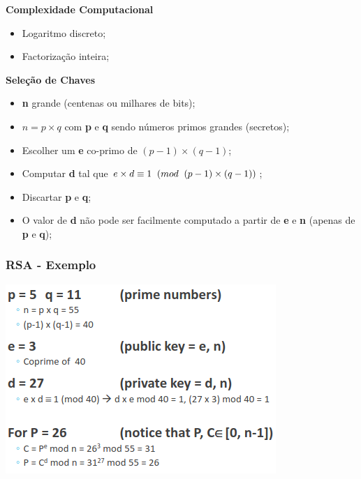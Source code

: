 \documentclass{article}
\begin{document}
\begin{flushleft}
  \textbf{Complexidade Computacional}
  \begin{itemize}
    \item Logaritmo discreto;
    \item Factorização inteira;
  \end{itemize}

  \vspace{2mm}

  \textbf{Seleção de Chaves}
  \begin{itemize}
    \item \textbf{n} grande (centenas ou milhares de bits);
    \item \textbf{$n = p \times q$} com \textbf{p} e \textbf{q} sendo números primos grandes (secretos);
    \item Escolher um \textbf{e} co-primo de \textbf{$(p-1) \times (q-1)$};
    \item Computar \textbf{d} tal que \textbf{$e \times d \equiv 1 \hspace{2mm} (mod \hspace{2mm} (p-1) \times (q-1))$};
    \item Discartar \textbf{p} e \textbf{q};
    \item O valor de \textbf{d} não pode ser facilmente computado a partir de \textbf{e} e \textbf{n} (apenas de \textbf{p} e \textbf{q});
  \end{itemize}
\end{flushleft}

\pagebreak

\subsubsection{RSA - Exemplo}

\begin{center}
  \includegraphics[scale=0.6]{4}
\end{center}
\end{document}
